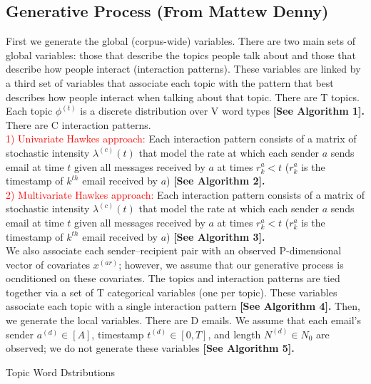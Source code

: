\documentclass[a4paper]{article}
\begin{document}
\subsection{Generative Process (From Mattew Denny)}
First we generate the global (corpus-wide) variables. There are two main sets of global variables: those that describe the
topics people talk about and those that describe how people interact (interaction patterns). These variables are linked by a
third set of variables that associate each topic with the pattern that best describes how people interact when talking about
that topic. There are T topics. Each topic $\phi^{(t)}$ is a discrete distribution over V word types \textbf{[See Algorithm 1].} There are C
interaction patterns. \\ \newline \textcolor{red}{1) Univariate Hawkes approach:} Each interaction pattern consists of a matrix of stochastic intensity $\lambda^{(c)}(t)$ that model the rate at which each sender $a$ sends email at time $t$ given all messages received by $a$ at times
$r_k^{a}< t$ ($r_k^{a}$ is the timestamp of $k^{th}$ email received by $a$)  \textbf{[See Algorithm 2].}  \\ \newline
 \textcolor{red}{2) Multivariate Hawkes approach:} Each interaction pattern consists of a matrix of stochastic intensity $\lambda^{(c)}(t)$ that model the rate at which each sender $a$ sends email at time $t$ given all messages received by $a$ at times
 	$r_k^{a}< t$ ($r_k^{a}$ is the timestamp of $k^{th}$ email received by $a$)  \textbf{[See Algorithm 3].}  \\\newline  We also associate each sender–recipient pair with an observed P-dimensional
vector of covariates $x^{(ar)}$; however, we assume that our generative process is ocnditioned on these covariates. The topics and interaction patterns are tied together via a set of T categorical variables (one per topic). These variables
associate each topic with a single interaction pattern \textbf{[See Algorithm 4].} Then, we generate the local variables. There are D
emails. We assume that each email’s sender $a^{(d)}\in [A]$, timestamp $t^{(d)} \in [0, T]$, and length $N^{(d)} \in N_0$ are observed; we do not generate these variables  \textbf{[See Algorithm 5].}
 \begin{algorithm}[H]
 	\SetAlgoLined
	\caption{Topic Word Dstributions}
\end{algorithm}
\end{document}
